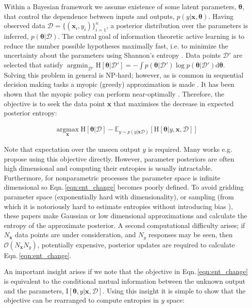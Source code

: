 \documentclass[twoside]{article}
\newcommand{\x}{\bm{x}}
\newcommand{\y}{y}
\newcommand{\data}{\mathcal{D}}
\newcommand{\param}{\bm{\theta}}
\newcommand{\argmax}{ \operatorname*{arg \max}}
\newcommand{\argmin}{ \operatorname*{arg \min}}
\newcommand{\E}{\mathbb{E}}
\newcommand{\rmI}{\mathrm{I}}
\newcommand{\rmH}{\mathrm{H}}
\begin{document}
Within a Bayesian framework we assume existence of some latent parameters, $\param$, that control the dependence between inputs and outputs, $p(\y\vert\x,\param)$. Having observed data $\data = \{(\x_i,\y_i)\}_{i=1}^n$, a posterior distribution over the parameters is inferred, $p(\param|\data)$. The central goal of information theoretic active learning is to reduce the number possible hypotheses maximally fast, i.e. to minimize the uncertainty about the parameters using Shannon's entropy \cite{coverandthomas}. Data points $\mathcal{D}'$ are selected that satisfy $\argmin_{\mathcal{D}'}\rmH[\param|\mathcal{D}']=-\int p(\param|\mathcal{D}')\log p(\param|\mathcal{D}') \mathrm{d}\param$. Solving this problem in general is NP-hard; however, as is common in sequential decision making tasks a myopic (greedy) approximation is made \cite{heckerman1995}. It has been shown that the myopic policy can perform near-optimally \cite{golovin2010,dasgupta2005}. Therefore, the objective is to seek the data point $\x$ that maximises the decrease in expected posterior entropy:

\begin{align}	
	\label{eqn:ent_change}
	\argmax_{\x} \rmH[\param | \data] - \E_{\y\sim p(\y|\x\data)} \left[ \rmH[\param| \y, \x,\data] \right] 
\end{align}

Note that expectation over the unseen output $\y$ is required. Many works e.g. \cite{mackay1992, krishnapuram2004, lawrence2003} propose using this objective directly. However, parameter posteriors are often high dimensional and computing their entropies is usually intractable. Furthermore, for nonparametric processes the parameter space is infinite dimensional so Eqn.\,\eqref{eqn:ent_change} becomes poorly defined. To avoid gridding parameter space (exponentially hard with dimensionality), or sampling (from which it is notoriously hard to estimate entropies without introducing bias \cite{panzeri2007}), these papers make Gaussian or low dimensional approximations and calculate the entropy of the approximate posterior. A second computational difficulty arises; if $N_{\x}$ data points are under consideration, and $N_{\y}$ responses may be seen, then $\mathcal{O}(N_{\x}N_{\y})$, potentially expensive, posterior updates are required to calculate Eqn.\,\eqref{eqn:ent_change}.

An important insight arises if we note that the objective in Eqn.\,\eqref{eqn:ent_change} is equivalent to the conditional mutual information between the unknown output and the parameters, $\rmI[\param,\y\vert\x,\data]$. Using this insight it is simple to show that the objective can be rearranged to compute entropies in $\y$ space:
\end{document}
